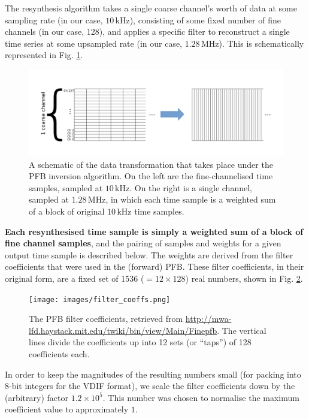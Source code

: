 \documentclass{article}
\begin{document}
The resynthesis algorithm takes a single coarse channel's worth of data at some sampling rate (in our case, $10\,$kHz), consisting of some fixed number of fine channels (in our case, 128), and applies a specific filter to reconstruct a single time series at some upsampled rate (in our case, $1.28\,$MHz).
This is schematically represented in Fig. \ref{fig:schematic}.
\begin{figure}[!ht]
    \centering
    \includegraphics[scale=0.6]{images/pfb_fig1.pdf}
    \vspace{-1cm}
    \caption{A schematic of the data transformation that takes place under the PFB inversion algorithm. On the left are the fine-channelised time samples, sampled at $10\,$kHz. On the right is a single channel, sampled at $1.28\,$MHz, in which each time sample is a weighted sum of a block of original $10\,$kHz time samples.}
    \label{fig:schematic}
\end{figure}

{\bf Each resynthesised time sample is simply a weighted sum of a block of fine channel samples}, and the pairing of samples and weights for a given output time sample is described below.
The weights are derived from the filter coefficients that were used in the (forward) PFB.
These filter coefficients, in their original form, are a fixed set of 1536 ($= 12 \times 128$) real numbers, shown in Fig. \ref{fig:filter_coeffs}.
\begin{figure}[!b]
    \centering
    \texttt{[image: images/filter\_coeffs.png]}
    \caption{The PFB filter coefficients, retrieved from \url{http://mwa-lfd.haystack.mit.edu/twiki/bin/view/Main/Finepfb}. The vertical lines divide the coefficients up into 12 sets (or ``taps'') of 128 coefficients each.}
    \label{fig:filter_coeffs}
\end{figure}
In order to keep the magnitudes of the resulting numbers small (for packing into 8-bit integers for the VDIF format), we scale the filter coefficients down by the (arbitrary) factor $1.2 \times 10^{5}$.
This number was chosen to normalise the maximum coefficient value to approximately $1$.
\end{document}
